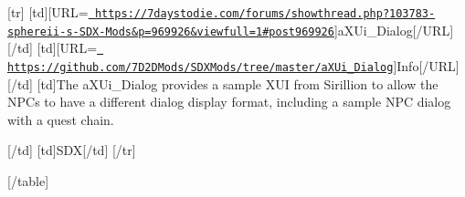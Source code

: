 \mbox{[}tr\mbox{]} \mbox{[}td\mbox{]}\mbox{[}U\+RL=\href{https://7daystodie.com/forums/showthread.php?103783-sphereii-s-SDX-Mods&p=969926&viewfull=1\#post969926}{\texttt{ https\+://7daystodie.\+com/forums/showthread.\+php?103783-\/sphereii-\/s-\/\+S\+D\+X-\/\+Mods\&p=969926\&viewfull=1\#post969926}}\mbox{]}a\+X\+Ui\+\_\+\+Dialog\mbox{[}/\+U\+RL\mbox{]}\mbox{[}/td\mbox{]} \mbox{[}td\mbox{]}\mbox{[}U\+RL=\href{https://github.com/7D2DMods/SDXMods/tree/master/aXUi_Dialog}{\texttt{ https\+://github.\+com/7\+D2\+D\+Mods/\+S\+D\+X\+Mods/tree/master/a\+X\+Ui\+\_\+\+Dialog}}\mbox{]}Info\mbox{[}/\+U\+RL\mbox{]}\mbox{[}/td\mbox{]} \mbox{[}td\mbox{]}The a\+X\+Ui\+\_\+\+Dialog provides a sample X\+UI from Sirillion to allow the N\+P\+Cs to have a different dialog display format, including a sample N\+PC dialog with a quest chain.

\mbox{[}/td\mbox{]} \mbox{[}td\mbox{]}S\+DX\mbox{[}/td\mbox{]} \mbox{[}/tr\mbox{]}

\mbox{[}/table\mbox{]} 
